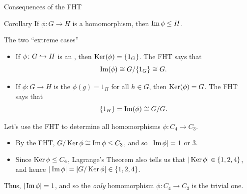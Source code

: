 \documentclass[8pt]{beamer}
\newcommand{\Pause}{}      %
\begin{document}
\begin{frame}{Consequences of the FHT} 
  
  \begin{block}{Corollary}
    If $\phi\colon G\to H$ is a homomorphism, then $\operatorname{Im}\phi\leq H$.
  \end{block}

  \Pause
    
  \begin{exampleblock}{The two ``extreme cases''}%
    \begin{itemize}
    \item If $\phi\colon G\hookrightarrow H$ is an , then
      $\operatorname{Ker}(\phi)=\{1_G\}$. \Pause The FHT says that
      \[
      \operatorname{Im}(\phi)\cong G/\{1_G\}\cong G.
      \]    
      \vspace{-4mm}\Pause
    \item If $\phi\colon G\to H$ is the 
      $\phi(g)=1_H$ for all $h\in G$, then $\operatorname{Ker}(\phi)=G$. \Pause The FHT
      says that
      \[
      \{1_H\}=\operatorname{Im}(\phi)\cong G/G.
      \]
      \vspace{-3mm}
    \end{itemize}  
  \end{exampleblock}
  
  \smallskip\Pause
  
  Let's use the FHT to determine all homomorphisms $\phi\colon
  C_4\to C_3$.
  
  \smallskip\Pause
  
  \begin{itemize}
  \item By the FHT, $G/\operatorname{Ker}\phi\cong\operatorname{Im}\phi\leq C_3$, and so \Pause
    $|\operatorname{Im}\phi|=1$ or $3$. \smallskip\Pause
  \item Since $\operatorname{Ker}\phi\leq C_4$, Lagrange's Theorem also tells us that
    $|\operatorname{Ker}\phi|\in\{1,2,4\}$, \Pause and hence
    $|\operatorname{Im}\phi|=|G/\operatorname{Ker}\phi|\in\{1,2,4\}$. \medskip\Pause
  \end{itemize}
  
  Thus, $|\operatorname{Im}\phi|=1$, and so the \emph{only} homomorphism $\phi\colon C_4\to
  C_3$ is the trivial one.
\end{frame}

\end{document}
